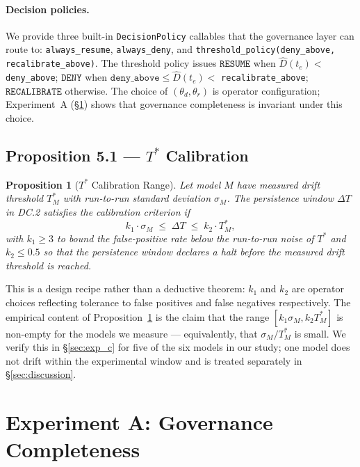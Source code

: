 \documentclass[11pt]{article}
\newtheorem{proposition}[theorem]{Proposition}
\newcommand{\Dhat}{\widehat{D}}
\newcommand{\RESUME}{\texttt{RESUME}}
\newcommand{\DENY}{\texttt{DENY}}
\newcommand{\RECAL}{\texttt{RECALIBRATE}}
\newcommand{\Tstar}{T^*}
\begin{document}
\paragraph{Decision policies.}
We provide three built-in \texttt{DecisionPolicy} callables that the
governance layer can route to: \texttt{always\_resume},
\texttt{always\_deny}, and \texttt{threshold\_policy(deny\_above,
recalibrate\_above)}. The threshold policy issues $\RESUME$ when
$\Dhat(t_e) <$ \texttt{deny\_above}; $\DENY$ when
$\texttt{deny\_above} \le \Dhat(t_e) <$ \texttt{recalibrate\_above};
$\RECAL$ otherwise. The choice of $(\theta_d, \theta_r)$ is operator
configuration; Experiment~A (\S\ref{sec:exp_a}) shows that
governance completeness is invariant under this choice.

\subsection{Proposition 5.1 --- $\Tstar$ Calibration}
\label{sec:prop_calibration}

\begin{proposition}[$\Tstar$ Calibration Range]
\label{prop:calibration}
Let model $M$ have measured drift threshold $\Tstar_M$ with run-to-run
standard deviation $\sigma_M$. The persistence window $\Delta T$ in
DC.2 satisfies the calibration criterion if
\[
   k_1 \cdot \sigma_M \;\le\; \Delta T \;\le\; k_2 \cdot \Tstar_M,
\]
with $k_1 \geq 3$ to bound the false-positive rate below the run-to-run
noise of $\Tstar$ and $k_2 \leq 0.5$ so that the persistence window
declares a halt before the measured drift threshold is reached.
\end{proposition}

This is a design recipe rather than a deductive theorem: $k_1$ and
$k_2$ are operator choices reflecting tolerance to false positives
and false negatives respectively. The empirical content of
Proposition~\ref{prop:calibration} is the claim that the range
$[k_1 \sigma_M, k_2 \Tstar_M]$ is non-empty for the models we
measure --- equivalently, that $\sigma_M / \Tstar_M$ is small. We
verify this in \S\ref{sec:exp_c} for five of the six models in our
study; one model does not drift within the experimental window
and is treated separately in \S\ref{sec:discussion}.

\section{Experiment A: Governance Completeness}
\label{sec:exp_a}
\end{document}
